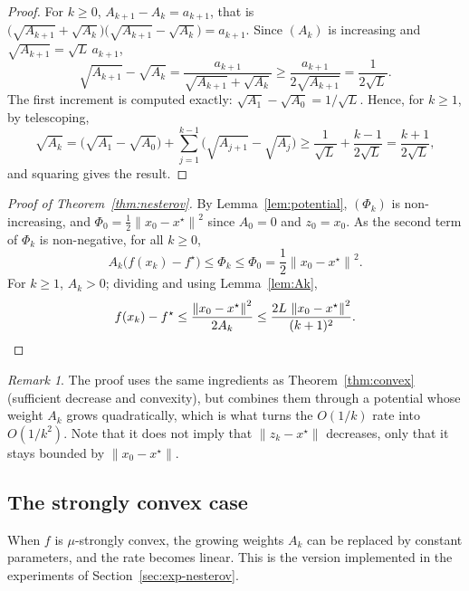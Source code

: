 \documentclass[11pt,a4paper]{article}
\theoremstyle{definition}
\theoremstyle{remark}
\newtheorem{remark}{Remark}
\newcommand{\norm}[1]{\left\lVert #1 \right\rVert}
\begin{document}
\begin{proof}
For $k \ge 0$, $A_{k+1} - A_k = a_{k+1}$, that is $\big(\sqrt{A_{k+1}} + \sqrt{A_k}\big)\big(\sqrt{A_{k+1}} - \sqrt{A_k}\big) = a_{k+1}$. Since $(A_k)$ is increasing and $\sqrt{A_{k+1}} = \sqrt{L}\,a_{k+1}$,
\[
\sqrt{A_{k+1}} - \sqrt{A_k} = \frac{a_{k+1}}{\sqrt{A_{k+1}} + \sqrt{A_k}} \ge \frac{a_{k+1}}{2\sqrt{A_{k+1}}} = \frac{1}{2\sqrt L}.
\]
The first increment is computed exactly: $\sqrt{A_1} - \sqrt{A_0} = 1/\sqrt{L}$. Hence, for $k \ge 1$, by telescoping,
\[
\sqrt{A_k} = \big(\sqrt{A_1} - \sqrt{A_0}\big) + \sum_{j=1}^{k-1}\big(\sqrt{A_{j+1}} - \sqrt{A_j}\big) \ge \frac{1}{\sqrt L} + \frac{k-1}{2\sqrt L} = \frac{k+1}{2\sqrt L},
\]
and squaring gives the result.
\end{proof}

\begin{proof}[Proof of Theorem~\ref{thm:nesterov}]
By Lemma~\ref{lem:potential}, $(\Phi_k)$ is non-increasing, and $\Phi_0 = \frac12\norm{x_0 - x^\star}^2$ since $A_0 = 0$ and $z_0 = x_0$. As the second term of $\Phi_k$ is non-negative, for all $k \ge 0$,
\[
A_k\big(f(x_k) - f^\star\big) \le \Phi_k \le \Phi_0 = \frac12\norm{x_0 - x^\star}^2 .
\]
For $k \ge 1$, $A_k > 0$; dividing and using Lemma~\ref{lem:Ak},
\[
f(x_k) - f^\star \le \frac{\norm{x_0 - x^\star}^2}{2A_k} \le \frac{2L\,\norm{x_0 - x^\star}^2}{(k+1)^2}. \qedhere
\]
\end{proof}

\begin{remark}
The proof uses the same ingredients as Theorem~\ref{thm:convex} (sufficient decrease and convexity), but combines them through a potential whose weight $A_k$ grows quadratically, which is what turns the $O(1/k)$ rate into $O(1/k^2)$. Note that it does not imply that $\norm{z_k - x^\star}$ decreases, only that it stays bounded by $\norm{x_0 - x^\star}$.
\end{remark}

\subsection{The strongly convex case}\label{sec:nesterov-sc}

When $f$ is $\mu$-strongly convex, the growing weights $A_k$ can be replaced by constant parameters, and the rate becomes linear. This is the version implemented in the experiments of Section~\ref{sec:exp-nesterov}.
\end{document}
